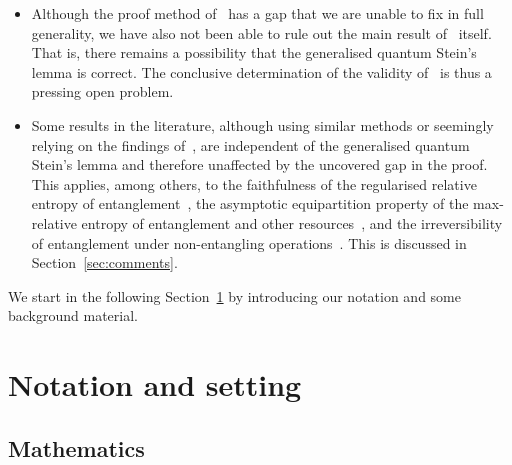 \documentclass[11pt,notitlepage,tightenlines,nofootinbib,superscriptaddress]{revtex4-1}
\begin{document}
\begin{itemize}
    \item Although the proof method of~\cite{Brandao2010} has a gap that we are unable to fix in full generality, we have also not been able to rule out the main result of~\cite[Proposition~III.1]{Brandao2010} itself. That is, there remains a possibility that the generalised quantum Stein's lemma is correct. The conclusive determination of the validity of~\cite{Brandao2010} is thus a pressing open problem.
    
    \item Some results in the literature, although using similar methods or seemingly relying on the findings of~\cite{Brandao2010}, are independent of the generalised quantum Stein's lemma and therefore unaffected by the uncovered gap in the proof. This applies, among others, to the faithfulness of the regularised relative entropy of entanglement~\cite{Piani2009}, the asymptotic equipartition property of the max-relative entropy of entanglement and other resources~\cite{Brandao2010,datta_2009-2}, and the irreversibility of entanglement under non-entangling operations~\cite{irreversibility}. This is discussed in Section~\ref{sec:comments}.
\end{itemize}

We start in the following Section~\ref{sec:notation} by introducing our notation and some background material.


\section{Notation and setting}\label{sec:notation}

\subsection{Mathematics}
\end{document}
